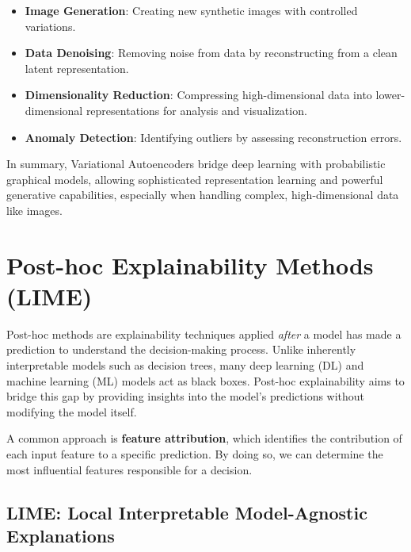 \begin{itemize}
\item \textbf{Image Generation}: Creating new synthetic images with controlled variations.
\item \textbf{Data Denoising}: Removing noise from data by reconstructing from a clean latent representation.
\item \textbf{Dimensionality Reduction}: Compressing high-dimensional data into lower-dimensional representations for analysis and visualization.
\item \textbf{Anomaly Detection}: Identifying outliers by assessing reconstruction errors.
\end{itemize}

In summary, Variational Autoencoders bridge deep learning with probabilistic graphical models, allowing sophisticated representation learning and powerful generative capabilities, especially when handling complex, high-dimensional data like images.


















\section{Post-hoc Explainability Methods (LIME)}

Post-hoc methods are explainability techniques applied \textit{after} a model has made a prediction to understand the decision-making process. Unlike inherently interpretable models such as decision trees, many deep learning (DL) and machine learning (ML) models act as black boxes. Post-hoc explainability aims to bridge this gap by providing insights into the model’s predictions without modifying the model itself.

A common approach is \textbf{feature attribution}, which identifies the contribution of each input feature to a specific prediction. By doing so, we can determine the most influential features responsible for a decision.

\subsection{LIME: Local Interpretable Model-Agnostic Explanations}

